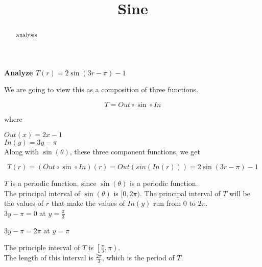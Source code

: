 \documentclass{ximera}
\title{Sine}
\begin{document}
\begin{abstract}
analysis
\end{abstract}
\maketitle












\textbf{\textcolor{purple!85!blue}{Analyze  $T(r) =  2 \sin(3r - \pi) - 1$}}



\begin{template}


We are going to view this as a composition of three functions.


\[
T = Out \circ \sin \circ In
\]


where


$Out(x) = 2x - 1$ \\


$In(y) = 3y - \pi$ \\




Along with $\sin(\theta)$, these three component functions, we get



\[
T(r) = (Out \circ \sin \circ In)(r) = Out(sin(In(r)))  = 2 \sin(3r - \pi) - 1
\]




\end{template}

$T$ is a periodic function, since $\sin(\theta)$ is a periodic function. \\

The principal interval of $\sin(\theta)$ is $[0, 2\pi)$.  The principal interval of $T$ will be the values of $r$ that make the values of $In(y)$ run from $0$ to $2\pi$. \\


$3y - \pi = 0$ at $y = \frac{\pi}{3}$

$3y - \pi = 2\pi$ at $y = \pi$

The principle interval of $T$ is $\left[ \frac{\pi}{3}, \pi \right)$. \\

The length of this interval is $\frac{2\pi}{3}$, which is the period of $T$. \\
\end{document}
